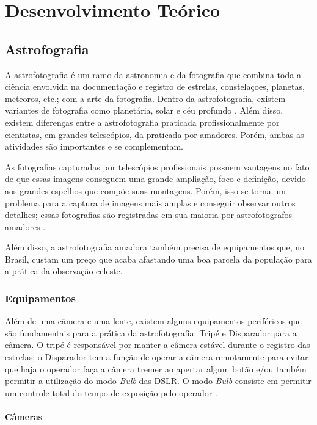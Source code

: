 \chapter{Desenvolvimento Teórico}

\section{Astrofografia}

A astrofotografia é um ramo da astronomia e da fotografia que combina toda a ciência envolvida na documentação e registro de estrelas, constelaçoes, planetas, meteoros, etc.; com a arte da fotografia. Dentro da astrofotografia, existem variantes de fotografia como planetária, solar e céu profundo \cite{livro:astropratica}. Além disso, existem diferenças entre a astrofotografia praticada profissionalmente por cientistas, em grandes telescópios, da praticada por amadores. Porém, ambas as atividades são importantes e se complementam.

As fotografias capturadas por telescópios profissionais possuem vantagens no fato de que essas imagens conseguem uma grande ampliação, foco e definição, devido aos grandes espelhos que compõe suas montagens. Porém, isso se torna um problema para a captura de imagens mais amplas e conseguir observar outros detalhes; essas fotografias são registradas em sua maioria por astrofotografos amadores \cite{livro:astropratica}.

Além disso, a astrofotografia amadora também precisa de equipamentos que, no Brasil, custam um preço que acaba afastando uma boa parcela da população para a prática da observação celeste. 

\subsection{Equipamentos}

Além de uma câmera e uma lente, existem alguns equipamentos periféricos que são fundamentais para a prática da astrofotografia: Tripé e Disparador para a câmera. O tripé é responsável por manter a câmera estável durante o registro das estrelas; o Disparador tem a função de operar a câmera remotamente para evitar que haja o operador faça a câmera tremer ao apertar algum botão e/ou também permitir a utilização do modo \textit{Bulb} das DSLR. O modo \textit{Bulb} consiste em permitir um controle total do tempo de exposição pelo operador \cite{book:bbcsky}.

\subsubsection{Câmeras}

